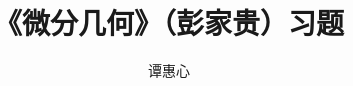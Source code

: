 \documentclass[paper=a5,pagesize=auto]{book}
\begin{document}
	\title{《微分几何》（彭家贵）习题}  %
	
	\author{谭惠心} %
	
	
	\maketitle  %
	
	\tableofcontents  %
	
	\mainmatter %
	
	
	
%	
%	
%	
	
\end{document}
